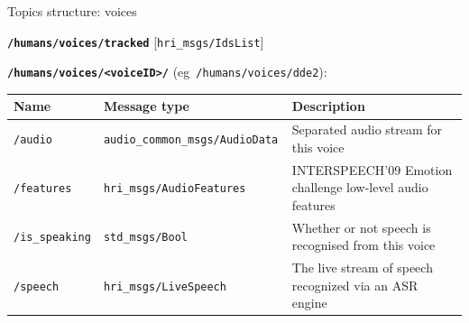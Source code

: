 \documentclass[xcolor=table,aspectratio=169]{beamer}
\begin{document}
\begin{frame}{Topics structure: voices}

    \textbf{\texttt{/humans/voices/tracked}}
    [\texttt{hri\_msgs/IdsList}]

    \vspace{1em}
    \textbf{\texttt{/humans/voices/<voiceID>/}} (eg~\texttt{/humans/voices/dde2}):

    \scriptsize
    \begin{tabular}{@{}p{2.5cm}p{4.5cm}p{6cm}@{}}
        \toprule
        \textbf{Name} & \textbf{Message type}         & \textbf{Description}                                                \\ \midrule
        \texttt{/audio       } & \texttt{audio\_common\_msgs/AudioData  } & Separated audio stream for this voice                     \\
        \texttt{/features    } & \texttt{hri\_msgs/AudioFeatures} & INTERSPEECH’09 Emotion challenge low-level audio features \\
        \texttt{/is\_speaking} & \texttt{std\_msgs/Bool         } & Whether or not speech is recognised from this voice       \\
        \texttt{/speech      } & \texttt{hri\_msgs/LiveSpeech       } & The live stream of speech recognized via an ASR engine \\
        \bottomrule               
\end{tabular}
    
\end{frame}
\end{document}
